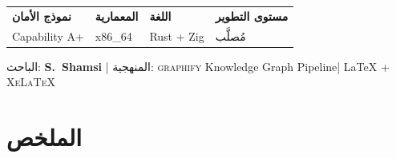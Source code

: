 \documentclass[12pt,a4paper]{article}
\theoremstyle{definition}
\newcommand{\en}[1]{\textenglish{#1}}
\begin{document}
\begin{titlepage}
\vspace{1.2cm}

\begin{center}
\begin{tabular}{C{3.2cm}C{3.2cm}C{3.2cm}C{3.2cm}}
\bfseries\color{lightblue}\textarabic{نموذج الأمان} &
\bfseries\color{lightblue}\textarabic{المعمارية} &
\bfseries\color{lightblue}\textarabic{اللغة} &
\bfseries\color{lightblue}\textarabic{مستوى التطوير} \\[4pt]
\color{white} Capability A+ &
\color{white} x86\_64 &
\color{white} Rust + Zig &
\color{white} مُصلَّب
\end{tabular}

\vspace{1.5cm}

{\small\color{white!70}%
  الباحث: \textbf{\en{S}.~Shamsi} \quad|\quad
  المنهجية: \textsc{graphify} Knowledge Graph Pipeline\quad|\quad
  \LaTeX{} + \textsc{XeLaTeX}}
\end{center}

\vfill
\end{titlepage}

\newpage
\section*{الملخص}
\end{document}
